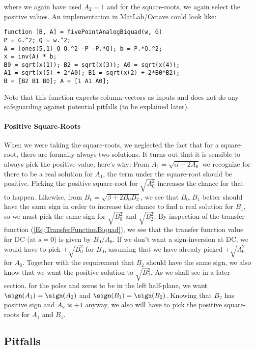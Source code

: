 where we again have used $A_2=1$ and for the square-roots, we again select the positive values. An implementation in MatLab/Octave could look like:
\begin{verbatim}
function [B, A] = fivePointAnalogBiquad(w, G)
P = G.^2; Q = w.^2;
A = [ones(5,1) Q Q.^2 -P -P.*Q]; b = P.*Q.^2;
x = inv(A) * b;
B0 = sqrt(x(1)); B2 = sqrt(x(3)); A0 = sqrt(x(4)); 
A1 = sqrt(x(5) + 2*A0); B1 = sqrt(x(2) + 2*B0*B2);
B = [B2 B1 B0]; A = [1 A1 A0];
\end{verbatim}
Note that this function expects column-vectors as inputs and does not do any safeguarding against potential pitfalls (to be explained later).
 
\paragraph{Positive Square-Roots}
When we were taking the square-roots, we neglected the fact that for a square-root, there are formally always two solutions. It turns out that it is sensible to always pick the positive value, here's why: From $A_1 = \sqrt{\alpha + 2 A_0}$ we recognize for there to be a real solution for $A_1$, the term under the square-root should be positive. Picking the positive square-root for $\sqrt{A_0^2}$ increases the chance for that to happen. Likewise, from $B_1 = \sqrt{\beta  + 2 B_0 B_2}$, we see that $B_0, B_1$ better should have the same sign in order to increase the chance to find a real solution for $B_1$, so we must pick the same sign for $\sqrt{B_0^2}$ and $\sqrt{B_2^2}$. By inspection of the transfer function (\ref{Eq:TransferFunctionBiquad}), we see that the transfer function value for DC (at $s = 0$) is given by $B_0/A_0$. If we don't want a sign-inversion at DC, we would have to pick $+\sqrt{B_0^2}$ for $B_0$, assuming that we have already picked $+\sqrt{A_0^2}$ for $A_0$. Together with the requirement that $B_2$ should have the same sign, we also know that we want the positive solution to $\sqrt{B_2^2}$. As we shall see in a later section, for the poles and zeros to be in the left half-plane, we want $\sign(A_1) = \sign(A_2)$ and  $\sign(B_1) = \sign(B_2)$. Knowing that $B_2$ has positive sign and $A_2$ is $+1$ anyway, we also will have to pick the positive square-roots for $A_1$ and $B_1$.



\subsection{Pitfalls}

